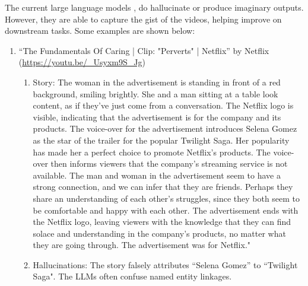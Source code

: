 The current large language models , do hallucinate or produce imaginary outputs. However, they are able to capture the gist of the videos, helping improve on downstream tasks. Some examples are shown below:

\begin{enumerate}
    \item ``The Fundamentals Of Caring | Clip: "Perverts" | Netflix'' by Netflix (\url{https://youtu.be/_Usyxm9S_Jg})
    \begin{enumerate}
        \item Story: The woman in the advertisement is standing in front of a red background, smiling brightly. She and a man sitting at a table look content, as if they've just come from a conversation. The Netflix logo is visible, indicating that the advertisement is for the company and its products. The voice-over for the advertisement introduces Selena Gomez as the star of the trailer for the popular Twilight Saga. Her popularity has made her a perfect choice to promote Netflix's products. The voice-over then informs viewers that the company's streaming service is not available. The man and woman in the advertisement seem to have a strong connection, and we can infer that they are friends. Perhaps they share an understanding of each other's struggles, since they both seem to be comfortable and happy with each other. The advertisement ends with the Netflix logo, leaving viewers with the knowledge that they can find solace and understanding in the company's products, no matter what they are going through. The advertisement was for Netflix."

        \item Hallucinations: The story falsely attributes ``Selena Gomez'' to ``Twilight Saga". The LLMs often confuse named entity linkages.
    \end{enumerate}


\end{enumerate}
